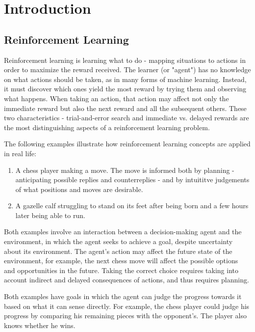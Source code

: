 
\chapter{Introduction}

\section{Reinforcement Learning}
Reinforcement learning is learning what to do - mapping situations to actions in order to maximize the reward received. The learner (or "agent") has no knowledge on what actions should be taken, as in many forms of machine learning. Instead, it must discover which ones yield the most reward by trying them and observing what happens. When taking an action, that action may affect not only the immediate reward but also the next reward and all the subsequent others. These two characteristics - trial-and-error search and immediate vs. delayed rewards are the most distinguishing aspects of a reinforcement learning problem. 

The following examples illustrate how reinforcement learning concepts are applied in real life:
\begin{enumerate}
    \item A chess player making a move. The move is informed both by planning - anticipating possible replies and counterreplies - and by intuititve judgements of what positions and moves are desirable.
    \item A gazelle calf struggling to stand on its feet after being born and a few hours later being able to run.
\end{enumerate}

Both examples involve an interaction between a decision-making agent and the environment, in which the agent seeks to achieve a goal, despite uncertainty about its environment. The agent's action may affect the future state of the environment, for example, the next chess move will affect the possible options and opportunities in the future. Taking the correct choice requires taking into account indirect and delayed consequences of actions, and thus requires planning.

Both examples have goals in which the agent can judge the progress towards it based on what it can sense directly. For example, the chess player could judge his progress by comparing his remaining pieces with the opponent's. The player also knows whether he wins.

